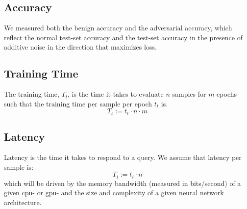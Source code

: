 \documentclass[conference]{IEEEtran}
\begin{document}
\subsection{Accuracy}
We measured both the benign accuracy and the adversarial accuracy, which reflect the normal test-set accuracy and the test-set accuracy in the presence of additive noise in the direction that maximizes loss.






\subsection{Training Time}
The training time, $T_t$, is the time it takes to evaluate $n$ samples for $m$ epochs such that the training time per sample per epoch $t_t$ is.
$$
T_t := t_t\cdot n\cdot m
$$

\subsection{Latency}
Latency is the time it takes to respond to a query. We assume that latency per sample is:
$$
T_i  := t_i \cdot n 
$$
which will be driven by the memory bandwidth (measured in bits/second) of a given cpu- or gpu-\cite{} and the size\cite{} and complexity\cite{} of a given neural network architecture.
\end{document}
